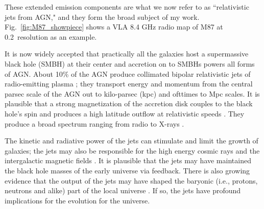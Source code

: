 These extended emission components are what we now refer to as ``relativistic jets from AGN," and they form the broad subject of my work. 
 Fig.~\ref{fig:M87_showpiece} shows a VLA 8.4 GHz radio map of M87 at 0.2\as~resolution as an example.
\begin{figure*}
    \caption{The 8.4GHz radio image of the relativistic jet in M87    \label{fig:M87_showpiece} }
\end{figure*}

It is now widely accepted that practically all the galaxies host a supermassive black hole (SMBH) at their center \citep[e.g.,][]{richstone1998supermassive} and accretion on to SMBHs powers all forms of AGN. About 10\% of the AGN produce collimated bipolar relativistic jets of radio-emitting plasma \citep[e.g.,][]{Padovani_2017}; they transport energy and momentum from the central parsec scale of the AGN out to kilo-parsec (kpc) and ofttimes to Mpc scales. It is plausible that a strong magnetization of the accretion disk couples to the black hole's spin and produces a high latitude outflow at relativistic speeds \citep[e.g.,][]{meier2001magnetohydrodynamic}. They produce a broad spectrum ranging from radio to X-rays \citep[e.g.,][]{harris2002x}.

The kinetic and radiative power of the jets can stimulate and limit the growth of galaxies;  the jets may also be responsible for the high energy cosmic rays and the intergalactic magnetic fields \citep[see ][]{blandford2019relativistic}. It is plausible that the jets may have maintained the black hole masses of the early universe \citep{churazov2005supermassive} via feedback. There is also growing evidence that the output of the jets may have shaped the baryonic (i.e., protons, neutrons and alike) part of the local universe  \citep[see][]{fabian2012observational}. If so, the jets have profound implications for the evolution for the universe.

